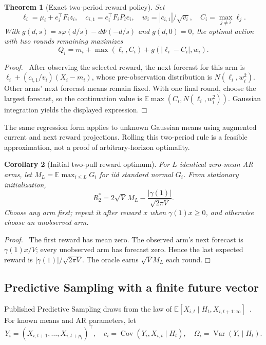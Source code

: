 \documentclass[11pt]{article}
\newtheorem{theorem}{Theorem}
\newtheorem{corollary}[theorem]{Corollary}
\newenvironment{proof}{\par\noindent\textit{Proof.}\ }{\hfill$\mdlgwhtsquare$\par\medskip}
\newcommand{\E}{\mathbb E}
\newcommand{\Var}{\operatorname{Var}}
\newcommand{\Cov}{\operatorname{Cov}}
\begin{document}
\begin{theorem}[Exact two-period reward policy]
Set
\[
\ell_i=\mu_i+e_i^\top F_iz_i,\quad
c_{i,1}=e_i^\top F_iP_ie_i,\quad
w_i=|c_{i,1}|/\sqrt{v_i},\quad C_i=\max_{j\ne i}\ell_j.
\]
With $g(d,s)=s\varphi(d/s)-d\Phi(-d/s)$ and $g(d,0)=0$, the optimal action with two rounds remaining maximizes
\begin{equation}
\boxed{Q_i=m_i+\max(\ell_i,C_i)+g(|\ell_i-C_i|,w_i).}
\label{eq:two-period}
\end{equation}
\end{theorem}
\begin{proof}
After observing the selected reward, the next forecast for this arm is
$\ell_i+(c_{i,1}/v_i)(X_i-m_i)$, whose pre-observation distribution is $N(\ell_i,w_i^2)$. Other arms' next forecast means remain fixed. With one final round, choose the largest forecast, so the continuation value is $\E\max(C_i,N(\ell_i,w_i^2))$. Gaussian integration yields the displayed expression.
\end{proof}
The same regression form applies to unknown Gaussian means using augmented current and next reward projections. Rolling this two-period rule is a feasible approximation, not a proof of arbitrary-horizon optimality.

\begin{corollary}[Initial two-pull reward optimum]
For $L$ identical zero-mean AR arms, let $M_L=\E\max_{i\leq L}G_i$ for iid standard normal $G_i$. From stationary initialization,
\begin{equation}
\boxed{R_2^*=2\sqrt V\,M_L-\frac{|\gamma(1)|}{\sqrt{2\pi V}}.}
\end{equation}
Choose any arm first; repeat it after reward $x$ when $\gamma(1)x\geq0$, and otherwise choose an unobserved arm.
\end{corollary}
\begin{proof}
The first reward has mean zero. The observed arm's next forecast is $\gamma(1)x/V$; every unobserved arm has forecast zero. Hence the last expected reward is $|\gamma(1)|/\sqrt{2\pi V}$. The oracle earns $\sqrt V M_L$ each round.
\end{proof}

\subsection{Predictive Sampling with a finite future vector}
Published Predictive Sampling draws from the law of $\E[X_{i,t}\mid H_t,X_{i,t+1:\infty}]$~\cite{liu2023}. For known means and AR parameters, let
\[
Y_i=(X_{i,t+1},\ldots,X_{i,t+p_i})^\top,\quad
c_i=\Cov(Y_i,X_{i,t}\mid H_t),\quad
\Omega_i=\Var(Y_i\mid H_t).
\]
\end{document}
